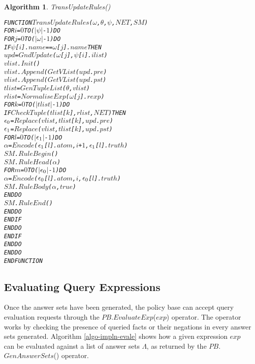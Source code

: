 \documentclass[11pt]{report}
\newenvironment{vverbatim}
{
  \begin{alltt}
}
{
    \vspace{-\baselineskip}
  \end{alltt}
}
\newtheorem{vvalgorithm}{Algorithm}[chapter]
\newenvironment{valgorithm}[2]
{
  \begin{vvalgorithm}{#1}
    \label{#2}
    \small
    \begin{vverbatim}
}
{
    \end{vverbatim}
  \end{vvalgorithm}
}
\begin{document}
          \begin{valgorithm}{TransUpdateRules()}{algo-impln-traup}
FUNCTION \(TransUpdateRules\)(\(\omega\), \(\theta\), \(\psi\), \(NET\), \(SM\))
  FOR \(i\) = \(0\) TO (\(|\psi|\) - \(1\)) DO
    FOR \(j\) = \(0\) TO (\(|\omega|\) - \(1\)) DO
      IF \(\psi\)[\(i\)].\(name\) == \(\omega\)[\(j\)].\(name\) THEN
        \(upd\) = \(GndUpdate\)(\(\omega\)[\(j\)], \(\psi\)[\(i\)].\(ilist\))
        \(vlist\).\(Init\)()
        \(vlist\).\(Append\)(\(GetVList\)(\(upd\).\(pre\))
        \(vlist\).\(Append\)(\(GetVList\)(\(upd\).\(pst\))
        \(tlist\) = \(GenTupleList\)(\(\theta\), \(vlist\))
        \(rlist\) = \(NormaliseExp\)(\(\omega\)[\(j\)].\(rexp\))
        FOR \(k\) = \(0\) TO (\(|tlist|\) - \(1\)) DO
          IF \(CheckTuple\)(\(tlist\)[\(k\)], \(rlist\), \(NET\)) THEN
            \(\epsilon\sb{0}\) = \(Replace\)(\(vlist\), \(tlist\)[\(k\)], \(upd\).\(pre\))
            \(\epsilon\sb{1}\) = \(Replace\)(\(vlist\), \(tlist\)[\(k\)], \(upd\).\(pst\))
            FOR \(l\) = \(0\) TO (\(|\)\(\epsilon\sb{1}\)\(|\) - \(1\)) DO
              \(\alpha\) = \(Encode\)(\(\epsilon\sb{1}\)[\(l\)].\(atom\), \(i\) + \(1\), \(\epsilon\sb{1}\)[\(l\)].\(truth\))
              \(SM\).\(RuleBegin\)()
              \(SM\).\(RuleHead\)(\(\alpha\))
              FOR \(m\) = \(0\) TO (\(|\)\(\epsilon\sb{0}\)\(|\) - \(1\)) DO
                \(\alpha\) = \(Encode\)(\(\epsilon\sb{0}\)[\(l\)].\(atom\), \(i\), \(\epsilon\sb{0}\)[\(l\)].\(truth\))
                \(SM\).\(RuleBody\)(\(\alpha\), \(true\))
              ENDDO
              \(SM\).\(RuleEnd\)()
            ENDDO
          ENDIF
        ENDDO
      ENDIF
    ENDDO
  ENDDO
ENDFUNCTION
          \end{valgorithm}

      \subsection{Evaluating Query Expressions}
        \label{subs-impln-evalu}

        Once the answer sets have been generated, the policy base can accept
        query evaluation requests through the $PB$.$EvaluateExp$($exp$)
        operator. The operator works by checking the presence of queried facts
        or their negations in every answer sets generated. Algorithm
        \ref{algo-impln-evale} shows how a given expression $exp$ can be
        evaluated against a list of answer sets $\Lambda$, as returned by
        the $PB$.$GenAnswerSets$() operator.
\end{document}
